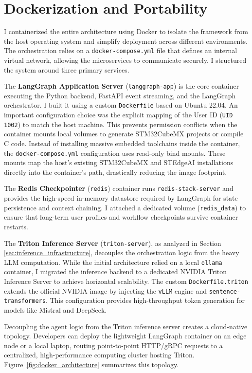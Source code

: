 \section{Dockerization and Portability}
\label{sec:dockerization}

I containerized the entire architecture using Docker to isolate the framework from the host operating system and simplify deployment across different environments. The orchestration relies on a \texttt{docker-compose.yml} file that defines an internal virtual network, allowing the microservices to communicate securely. I structured the system around three primary services.

The \textbf{LangGraph Application Server} (\texttt{langgraph-app}) is the core container executing the Python backend, FastAPI event streaming, and the LangGraph orchestrator. I built it using a custom \texttt{Dockerfile} based on Ubuntu 22.04. An important configuration choice was the explicit mapping of the User ID (\texttt{UID 1002}) to match the host machine. This prevents permission conflicts when the container mounts local volumes to generate STM32CubeMX projects or compile C code. Instead of installing massive embedded toolchains inside the container, the \texttt{docker-compose.yml} configuration uses read-only bind mounts. These mounts map the host's existing STM32CubeMX and STEdgeAI installations directly into the container's path, drastically reducing the image footprint.

The \textbf{Redis Checkpointer} (\texttt{redis}) container runs \texttt{redis-stack-server} and provides the high-speed in-memory datastore required by LangGraph for state persistence and context chaining. I attached a dedicated volume (\texttt{redis\_data}) to ensure that long-term user profiles and workflow checkpoints survive container restarts.

The \textbf{Triton Inference Server} (\texttt{triton-server}), as analyzed in Section \ref{sec:inference_infrastructure}, decouples the orchestration logic from the heavy LLM computation. While the initial architecture relied on a local \texttt{ollama} container, I migrated the inference backend to a dedicated NVIDIA Triton Inference Server to achieve horizontal scalability. The custom \texttt{Dockerfile.triton} extends the official NVIDIA image by injecting the \texttt{vLLM} engine and \texttt{sentence-transformers}. This configuration provides high-throughput token generation for models like Mistral and DeepSeek.

Decoupling the agent logic from the Triton inference server creates a cloud-native topology. Developers can deploy the lightweight LangGraph container on an edge node or a local laptop, routing point-to-point HTTP/gRPC requests to a centralized, high-performance computing cluster hosting Triton. Figure~\ref{fig:docker_architecture} summarizes this topology.

